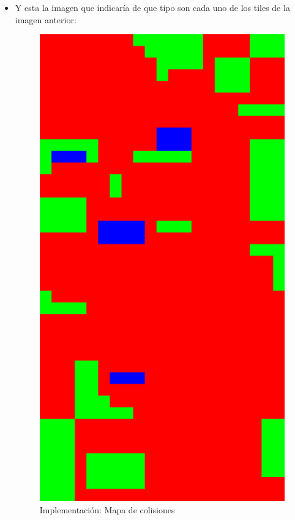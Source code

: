 \begin{itemize}
    \item Y esta la imagen que indicaría de que tipo son cada uno de los tiles de la imagen anterior:
    \begin{figure}[H]
      \label{collisionmap}
      \begin{center}
        \includegraphics[scale=0.3]{imagenes/collisionmap.png}
      \end{center}
      \caption{Implementación: Mapa de colisiones}
    \end{figure}
    
\end{itemize}

